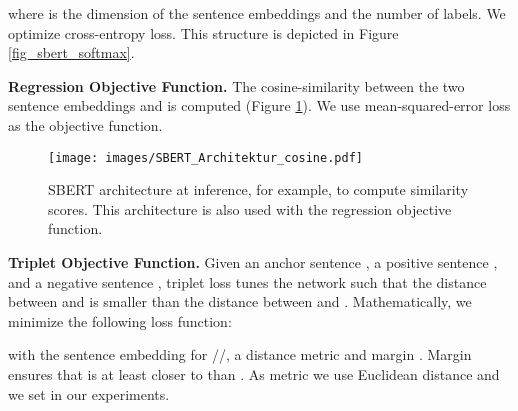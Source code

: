 \documentclass[11pt,a4paper]{article}
\begin{document}
where  is the dimension of the sentence embeddings and  the number of labels. We optimize cross-entropy loss. This structure is depicted in Figure \ref{fig_sbert_softmax}.

\textbf{Regression Objective Function.} The cosine-similarity between the two sentence embeddings  and  is computed (Figure \ref{fig_sbert_cosine}). We use mean-squared-error loss as the objective function.



\begin{figure}[t]
	\centering
	\texttt{[image: images/SBERT\_Architektur\_cosine.pdf]}
	\caption{SBERT architecture at inference, for example, to compute similarity scores. This architecture is also used with the regression objective function.}
	\label{fig_sbert_cosine}
\end{figure}

\textbf{Triplet Objective Function.} Given an anchor sentence , a positive sentence , and a negative sentence , triplet loss tunes the network such that the distance between  and  is smaller than the distance between  and . Mathematically, we minimize the following loss function:


with  the sentence embedding for //,  a distance metric and margin . Margin  ensures that  is at least  closer to  than . As metric we use Euclidean distance and we set  in our experiments. 
\end{document}
